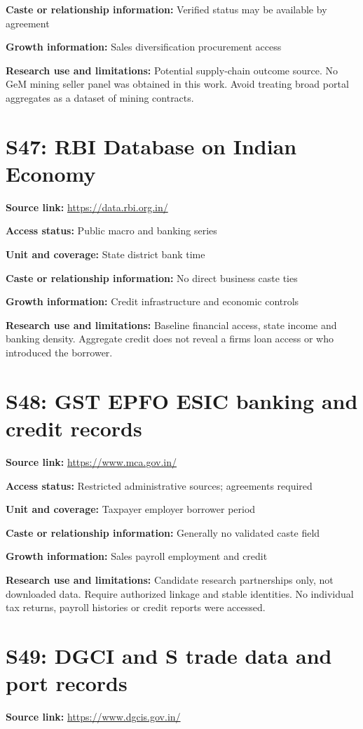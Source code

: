\documentclass[11pt,a4paper]{report}
\begin{document}
\textbf{Caste or relationship information:} Verified status may be available by agreement

\textbf{Growth information:} Sales diversification procurement access

\textbf{Research use and limitations:} Potential supply-chain outcome source. No GeM mining seller panel was obtained in this work. Avoid treating broad portal aggregates as a dataset of mining contracts.

\section{S47: RBI Database on Indian Economy}\hypertarget{S47}{}
\textbf{Source link:} \url{https://data.rbi.org.in/}

\textbf{Access status:} Public macro and banking series

\textbf{Unit and coverage:} State district bank time

\textbf{Caste or relationship information:} No direct business caste ties

\textbf{Growth information:} Credit infrastructure and economic controls

\textbf{Research use and limitations:} Baseline financial access, state income and banking density. Aggregate credit does not reveal a firms loan access or who introduced the borrower.

\section{S48: GST EPFO ESIC banking and credit records}\hypertarget{S48}{}
\textbf{Source link:} \url{https://www.mca.gov.in/}

\textbf{Access status:} Restricted administrative sources; agreements required

\textbf{Unit and coverage:} Taxpayer employer borrower period

\textbf{Caste or relationship information:} Generally no validated caste field

\textbf{Growth information:} Sales payroll employment and credit

\textbf{Research use and limitations:} Candidate research partnerships only, not downloaded data. Require authorized linkage and stable identities. No individual tax returns, payroll histories or credit reports were accessed.

\section{S49: DGCI and S trade data and port records}\hypertarget{S49}{}
\textbf{Source link:} \url{https://www.dgcis.gov.in/}
\end{document}
